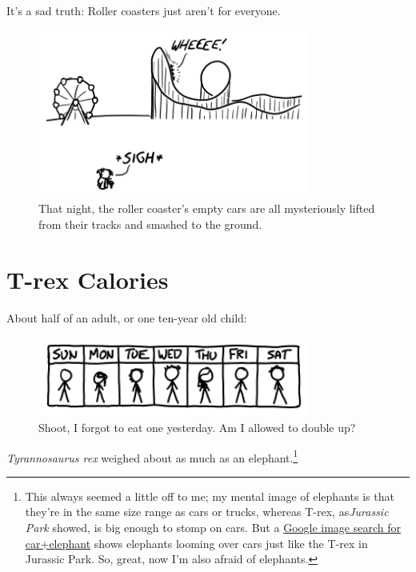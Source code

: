 {{It's a sad truth: Roller coasters just aren't for everyone.}

\begin{figure}[!htbp]
\centering
\includegraphics[scale=0.5, max width=0.8\textwidth]{imgs/a/77/height_sad.png}
\caption{That night, the roller coaster's empty cars are all mysteriously lifted from their tracks and smashed to the ground.}
\end{figure}

{
\chapter{T-rex Calories}
}

\hfill{}

{About half of an adult, or one ten-year old child:}

\begin{figure}[!htbp]
\centering
\includegraphics[scale=0.5, max width=0.8\textwidth]{imgs/a/78/trex_calendar.png}
\caption{Shoot, I forgot to eat one yesterday. Am I allowed to double up?}
\end{figure}

{ \emph{Tyrannosaurus rex} weighed about as much as an elephant.{\footnote{This always seemed a little off to me; my mental image of elephants is that they're in the same size range as cars or trucks, whereas T-rex, as\emph{Jurassic Park} showed, is big enough to stomp on cars. But a \href{https://www.google.com/search?tbm=isch&q=elephant+car}{Google image search for car+elephant} shows elephants looming over cars just like the T-rex in Jurassic Park. So, great, now I'm also afraid of elephants.} } }

}
